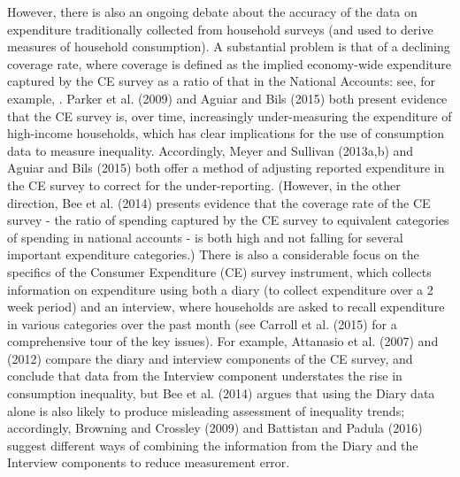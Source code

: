 However, there is also an ongoing debate about the accuracy of the data on expenditure traditionally collected from household surveys (and used to derive measures of household consumption). A substantial problem is that of a declining coverage rate, where coverage is defined as the implied economy-wide expenditure captured by the CE survey as a ratio of that in the National Accounts: see, for example, \citet{Barrettetal2014}. Parker et al. (2009) and Aguiar and Bils (2015) both present evidence that the CE survey is, over time, increasingly under-measuring the expenditure of high-income households, which has clear implications for the use of consumption data to measure inequality. Accordingly, Meyer and Sullivan (2013a,b) and Aguiar and Bils (2015) both offer a method of adjusting reported expenditure in the CE survey to correct for the under-reporting. (However, in the other direction, Bee et al. (2014) presents evidence that the coverage rate of the CE survey - the ratio of spending captured by the CE survey to equivalent categories of spending in national accounts - is both high and not falling for several important expenditure categories.) There is also a considerable focus on the specifics of the Consumer Expenditure (CE) survey instrument, which collects information on expenditure using both a diary (to collect expenditure over a 2 week period) and an interview, where households are asked to recall expenditure in various categories over the past month (see Carroll et al. (2015) for a comprehensive tour of the key issues). For example, Attanasio et al. (2007) and (2012) compare the diary and interview components of the CE survey, and conclude that data from the Interview component understates the rise in consumption inequality, but Bee et al. (2014) argues that using the Diary data alone is also likely to produce misleading assessment of inequality trends; accordingly, Browning and Crossley (2009) and Battistan and Padula (2016) suggest different ways of combining the information from the Diary and the Interview components to reduce measurement error. 


